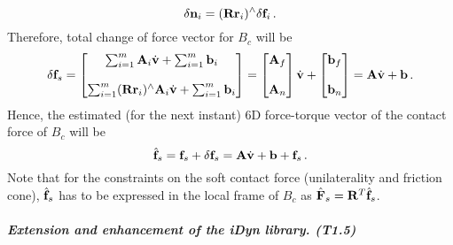 %
\begin{equation}
  \delta \mathbf{n}_i = (\mathbf{R} \mathbf{r}_i)^{\wedge} \delta \mathbf{f}_i \, .
\end{equation}
%
Therefore, total change of force vector for $B_c$ will be
%
\begin{equation}
  \delta \mathbf{f}_s =
  \begin{bmatrix}
    \sum_{i=1}^m \mathbf{A}_i \dot{\mathbf{v}} + \sum_{i=1}^m \mathbf{b}_i\\
    \\
    \sum_{i=1}^m (\mathbf{R} \mathbf{r}_i)^{\wedge} \mathbf{A}_i \dot{\mathbf{v}} + \sum_{i=1}^m \mathbf{b}_i
  \end{bmatrix}
  =
  \begin{bmatrix}
    \mathbf{A}_f \\
    \\
    \mathbf{A}_n
  \end{bmatrix}
  \dot{\mathbf{v}} +
  \begin{bmatrix}
    \mathbf{b}_f \\
    \\
    \mathbf{b}_n
  \end{bmatrix}
  = \mathbf{A} \dot{\mathbf{v}} + \mathbf{b} \, .
\end{equation}
%
Hence, the estimated (for the next instant) 6D force-torque vector of the
contact force of $B_c$ will be
%
\begin{equation}
  \hat{\mathbf{f}}_s = \mathbf{f}_s + \delta \mathbf{f}_s = \mathbf{A} \dot{\mathbf{v}} + \mathbf{b} + \mathbf{f}_s \, .
\end{equation}
%
Note that for the constraints on the soft contact force (unilaterality and
friction cone), $\hat{\mathbf{f}}_s$ has to be expressed in the local frame of $B_c$
as $\hat{\mathbf{F}}_s = \mathbf{R}^T \hat{\mathbf{f}}_s$.

  
\subparagraph{Extension and enhancement of the iDyn library. (T1.5)}
\label{sec:T15}












